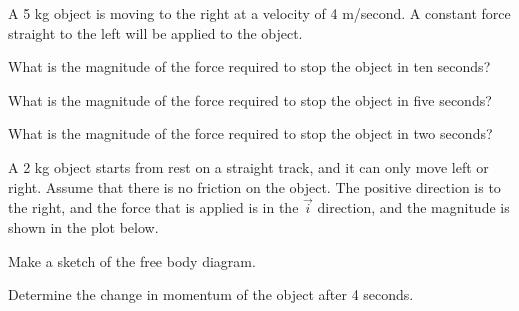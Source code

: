 \begin{problem}
\item A 5 kg object is moving to the right at a velocity of 4
  m/second. A constant force straight to the left will be applied to
  the object.
  \begin{subproblem}
  \item What is the magnitude of the force required to stop the object
    in ten seconds?
    \vfill
  \item What is the magnitude of the force required to stop the object
    in five seconds?
    \vfill
  \item What is the magnitude of the force required to stop the object
    in two seconds?
    \vfill
  \end{subproblem}

  \clearpage

\item A 2 kg object starts from rest on a straight track, and it can
  only move left or right. Assume that there is no friction on the
  object. The positive direction is to the right, and the force that
  is applied is in the $\vec{i}$ direction, and the magnitude is shown
  in the plot below.

  \scalebox{0.5}{}

  \begin{subproblem}
    \item Make a sketch of the free body diagram.
      \vspace{4em}
    \item Determine the change in momentum of the object after 4
      seconds.
      \vfill
  \end{subproblem}

\end{problem}


